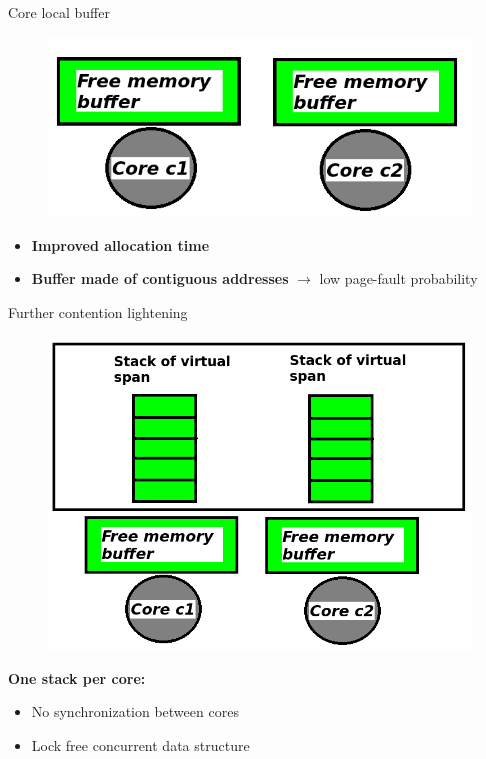 \documentclass[xcolor=x11names,compress]{beamer}
\renewcommand{\(}{\begin{columns}}
\renewcommand{\)}{\end{columns}}
\newcommand{\<}[1]{\begin{column}{#1}}
\renewcommand{\>}{\end{column}}
\begin{document}

\begin{frame}{Core local buffer}
	\begin{figure}
		\includegraphics[width=0.7\linewidth]{charts/coreLocalBuffer.png}
	\end{figure}


	\begin{itemize}
		\item \textbf{Improved allocation time}
		\item \textbf{Buffer made of contiguous addresses} $\rightarrow$ low page-fault probability

	\end{itemize}
\end{frame}



\begin{frame}{Further contention lightening}
	\begin{figure}
		\includegraphics[width=0.6\linewidth]{charts/globalArchitecture.png}
	\end{figure}

	\textbf{One stack per core:}
	\begin{itemize}
		\item No synchronization between cores
		\item Lock free concurrent data structure
	\end{itemize}
\end{frame}
\end{document}
